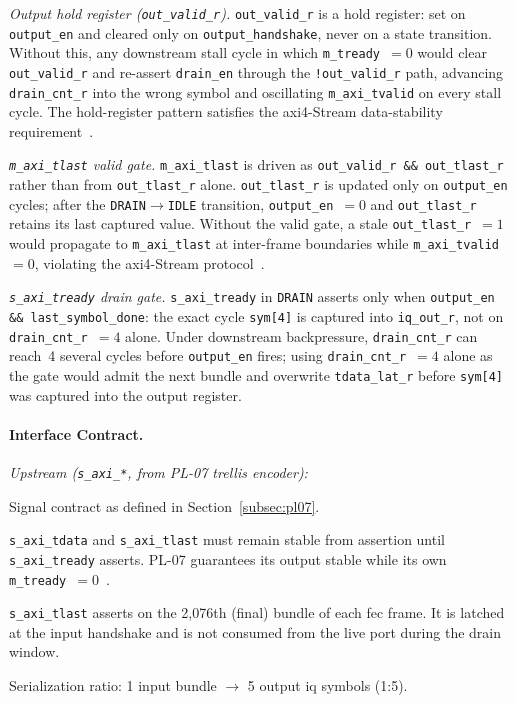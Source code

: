 \textit{Output hold register (\texttt{out\_valid\_r}).}
\texttt{out\_valid\_r} is a hold register: set on \texttt{output\_en}
and cleared only on \texttt{output\_handshake}, never on a state
transition.
Without this, any downstream stall cycle in which
\texttt{m\_tready}~$= 0$ would clear \texttt{out\_valid\_r} and
re-assert \texttt{drain\_en} through the \texttt{!out\_valid\_r} path,
advancing \texttt{drain\_cnt\_r} into the wrong symbol and oscillating
\texttt{m\_axi\_tvalid} on every stall cycle.
The hold-register pattern satisfies the \ac{axi}4-Stream data-stability
requirement~\cite{ARM_IHI0022}.

\textit{\texttt{m\_axi\_tlast} valid gate.}
\texttt{m\_axi\_tlast} is driven as
\texttt{out\_valid\_r \&\& out\_tlast\_r} rather than from
\texttt{out\_tlast\_r} alone.
\texttt{out\_tlast\_r} is updated only on \texttt{output\_en} cycles;
after the \texttt{DRAIN}$\to$\texttt{IDLE} transition,
\texttt{output\_en}~$= 0$ and \texttt{out\_tlast\_r} retains its last
captured value.
Without the valid gate, a stale \texttt{out\_tlast\_r}~$= 1$ would
propagate to \texttt{m\_axi\_tlast} at inter-frame boundaries while
\texttt{m\_axi\_tvalid}~$= 0$, violating the \ac{axi}4-Stream
protocol~\cite{ARM_IHI0022}.

\textit{\texttt{s\_axi\_tready} drain gate.}
\texttt{s\_axi\_tready} in \texttt{DRAIN} asserts only when
\texttt{output\_en \&\& last\_symbol\_done}: the exact cycle
\texttt{sym[4]} is captured into \texttt{iq\_out\_r}, not on
\texttt{drain\_cnt\_r}~$= 4$ alone.
Under downstream backpressure, \texttt{drain\_cnt\_r} can reach~4
several cycles before \texttt{output\_en} fires; using
\texttt{drain\_cnt\_r}~$= 4$ alone as the gate would admit the next
bundle and overwrite \texttt{tdata\_lat\_r} before \texttt{sym[4]} was
captured into the output register.


\FloatBarrier
\paragraph{Interface Contract.}

\textit{Upstream (\texttt{s\_axi\_*}, from PL-07 trellis encoder):}
\begin{tightemize}
  \item Signal contract as defined in Section~\ref{subsec:pl07}.
  \item \texttt{s\_axi\_tdata} and \texttt{s\_axi\_tlast} must remain
        stable from assertion until \texttt{s\_axi\_tready} asserts.
        PL-07 guarantees its output stable while its own
        \texttt{m\_tready}~$= 0$~\cite{ARM_IHI0022}.
  \item \texttt{s\_axi\_tlast} asserts on the 2{,}076th (final) bundle
        of each \ac{fec} frame.
        It is latched at the input handshake and is not consumed from
        the live port during the drain window.
  \item Serialization ratio: 1 input bundle $\to$ 5 output \ac{iq}
        symbols (1:5).
\end{tightemize}

